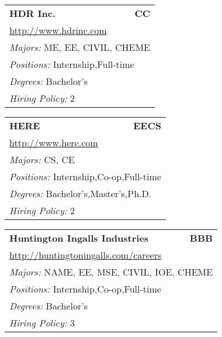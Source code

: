 \documentclass[twoside]{article}
\begin{document}
\begin{center}
\begin{multicols}{3}
\begin{FlushLeft}
\begin{minipage}{.9\columnwidth}
\end{minipage}
 
\begin{minipage}{.9\columnwidth}\begin{tabularx}{.95\columnwidth}{Xr}
                 {\Large\bf HDR Inc.} & {\Large\bf CC}\\
    \multicolumn{2}{p{.95\columnwidth}}{\url{http://www.hdrinc.com}}\\
    \multicolumn{2}{p{.95\columnwidth}}{\emph{Majors:} ME, EE, CIVIL, CHEME}\\
    \multicolumn{2}{p{.95\columnwidth}}{\emph{Positions:} Internship,Full-time}\\
    \multicolumn{2}{p{.95\columnwidth}}{\emph{Degrees:} Bachelor's}\\
    \multicolumn{2}{p{.95\columnwidth}}{\emph{Hiring Policy:} 2}\\
    \end{tabularx}
    
\end{minipage}
 
\begin{minipage}{.9\columnwidth}\begin{tabularx}{.95\columnwidth}{Xr}
                 {\Large\bf HERE} & {\Large\bf EECS}\\
    \multicolumn{2}{p{.95\columnwidth}}{\url{http://www.here.com}}\\
    \multicolumn{2}{p{.95\columnwidth}}{\emph{Majors:} CS, CE}\\
    \multicolumn{2}{p{.95\columnwidth}}{\emph{Positions:} Internship,Co-op,Full-time}\\
    \multicolumn{2}{p{.95\columnwidth}}{\emph{Degrees:} Bachelor's,Master's,Ph.D.}\\
    \multicolumn{2}{p{.95\columnwidth}}{\emph{Hiring Policy:} 2}\\
    \end{tabularx}
    
\end{minipage}
 
\begin{minipage}{.9\columnwidth}\begin{tabularx}{.95\columnwidth}{Xr}
                 {\Large\bf Huntington Ingalls Industries} & {\Large\bf BBB}\\
    \multicolumn{2}{p{.95\columnwidth}}{\url{http://huntingtoningalls.com/careers}}\\
    \multicolumn{2}{p{.95\columnwidth}}{\emph{Majors:} NAME, EE, MSE, CIVIL, IOE, CHEME}\\
    \multicolumn{2}{p{.95\columnwidth}}{\emph{Positions:} Internship,Co-op,Full-time}\\
    \multicolumn{2}{p{.95\columnwidth}}{\emph{Degrees:} Bachelor's}\\
    \multicolumn{2}{p{.95\columnwidth}}{\emph{Hiring Policy:} 3}\\
    \end{tabularx}
    

\end{minipage}
\end{FlushLeft}
\end{multicols}
\end{center}
\end{document}
